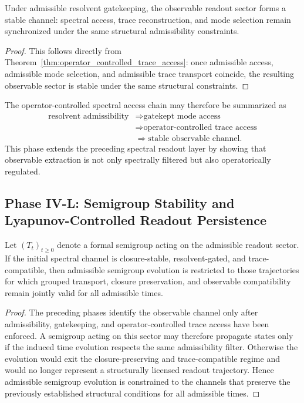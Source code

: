 \begin{corollary}\label{cor:stable_observable_channel}
Under admissible resolvent gatekeeping, the observable readout sector forms a stable channel: spectral access, trace reconstruction, and mode selection remain synchronized under the same structural admissibility constraints.
\end{corollary}
\begin{proof}
This follows directly from Theorem~\ref{thm:operator_controlled_trace_access}: once admissible access, admissible mode selection, and admissible trace transport coincide, the resulting observable sector is stable under the same structural constraints.
\end{proof}

\begin{remark}\label{rem:resolvent_to_readout_chain}
The operator-controlled spectral access chain may therefore be summarized as
\[
\begin{aligned}
\text{resolvent admissibility}
&\Longrightarrow \text{gatekept mode access}\\
&\Longrightarrow \text{operator-controlled trace access}\\
&\Longrightarrow \text{stable observable channel}.
\end{aligned}
\]
This phase extends the preceding spectral readout layer by showing that observable extraction is not only spectrally filtered but also operatorically regulated.
\end{remark}



\subsection*{Phase IV-L: Semigroup Stability and Lyapunov-Controlled Readout Persistence}

\begin{lemma}\label{lem:semigroup_admissibility}
Let $(T_t)_{t\ge 0}$ denote a formal semigroup acting on the admissible readout sector. If the initial spectral channel is closure-stable, resolvent-gated, and trace-compatible, then admissible semigroup evolution is restricted to those trajectories for which grouped transport, closure preservation, and observable compatibility remain jointly valid for all admissible times.
\end{lemma}
\begin{proof}
The preceding phases identify the observable channel only after admissibility, gatekeeping, and operator-controlled trace access have been enforced. A semigroup acting on this sector may therefore propagate states only if the induced time evolution respects the same admissibility filter. Otherwise the evolution would exit the closure-preserving and trace-compatible regime and would no longer represent a structurally licensed readout trajectory. Hence admissible semigroup evolution is constrained to the channels that preserve the previously established structural conditions for all admissible times.
\end{proof}

